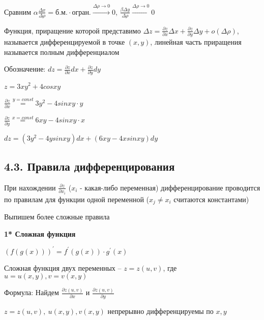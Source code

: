 \documentclass[12pt]{article}
\begin{document}
    Сравним $\displaystyle \alpha \frac{\Delta x}{\Delta \rho} = \text{б.м.} \cdot \text{огран.} \stackrel{\Delta \rho \to 0}{\to} 0$, $\displaystyle \frac{\beta \Delta y}{\Delta \rho} \stackrel{\Delta \rho \to 0}{\to} 0$

    Функция, приращение которой представимо $\displaystyle \Delta z = \frac{\partial z}{\partial x}\Delta x + \frac{\partial z}{\partial y}\Delta y + o(\Delta \rho)$, называется дифференцируемой в точке $\displaystyle (x, y)$,
    линейная часть приращения называется полным дифференциалом

    Обозначение: $\displaystyle dz = \frac{\partial z}{\partial x} dx + \frac{\partial z}{\partial y} dy$

    \Ex $\displaystyle z = 3xy^2 + 4cosxy$

    $\displaystyle \frac{\partial z}{\partial x} \stackrel{y = const}{=} 3y^2 - 4sinxy \cdot y$

    $\displaystyle \frac{\partial z}{\partial y} \stackrel{x = const}{=} 6xy - 4sinxy \cdot x$

    $\displaystyle dz = (3y^2 - 4ysinxy)dx + (6xy - 4xsinxy)dy$
    
    \vspace{8mm}

    \subsection{4.3. Правила дифференцирования}

    \Nota При нахождении $\displaystyle \frac{\partial z}{\partial x_i}$ ($x_i$ - какая-либо переменная) дифференцирование проводится по правилам для функции одной переменной ($x_j \neq x_i$ считаются константами)

    Выпишем более сложные правила
    
    \vspace{3mm}

    \hypertarget{derivativeofcomplexfunctionoftwovariables}{}

    \textbf{1* Сложная функция}

    \Mem $\displaystyle (f(g(x)))^\prime = f^\prime(g(x)) \cdot g^\prime(x)$

        \Def Сложная функция двух переменных -- $\displaystyle z = z(u, v)$, где $u = u(x, y), v = v(x, y)$

    Формула: Найдем $\displaystyle \frac{\partial z(u, v)}{\partial x}$ и $\displaystyle \frac{\partial z(u, v)}{\partial y}$

    \Th $\displaystyle z = z(u, v), \ u(x, y), v(x, y)$ непрерывно дифференцируемы по $\displaystyle x, y$
\end{document}
